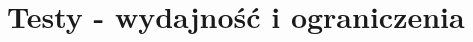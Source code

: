\chapter{Testy - wydajność i ograniczenia}
	\begin{comment}
		Testy:
			- Porównanie dla trybu "Natywnego", "URM::Core", "URM::Engine".
			- Porównanie złożoności kodu.
			1) Wydajność przetwarzania wierzchołków.
				* Testy wyświetlania obiektów o bardzo złożonej topologii.
				- Oszacowanie maksymalnej ilości wierzchołków.
				- Sprawdzenie narzutu na CPU i GPU.
				+ Optymalizacje vertex shader'a.
				
			2) Wydajność generowania oświetlenia
				* Sprawdzenie narzutu wydajności wielu źródeł światła.
				- Oszacowanie maksymalnego limitu ilości świateł w scenie.
				+ Dodanie bardziej zaawansowanego silnika obliczania efektów oświetlenia.
				
			3) Testy wydajności pixel shader'a.
				- Sprawdzenia skalowania wydajności zależnie od rozdzielczości.
				- Sprawdzenie bottleneck'u (CPU / GPU).
				
			4) Instance rendering.
				- Sprawdzenie jak moduł radzi sobie z rysowaniem wielu instancji tego samego lub różnych obiektów.
				- Porównanie wydajności z różnymi shader'ami i tym samym shader'em.
				
			5) Wydajność wczytywania modeli i tekstur z pliku.
				- Porównanie różnych formatów.
				- Porównanie różnych opcji preprocessingu.
				- Porównanie pierwszego i kolejnych wczytań modelu (AssetManager).
				
			6) Testy wydajności macierzy transformacji w Transform.
				- Określenie złożoności obliczeniowej poszczególnych funkcji.
				- Oszacowanie maksymalnej głębokości oraz szerokości drzewa obiektów.
				- Sprawdzenie narzutu wielokrotnego ustalania pozycji.
				+ Cache'ing.
				
	\end{comment}